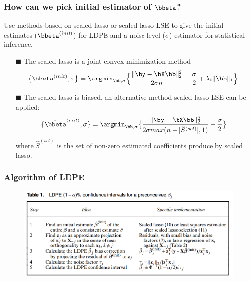 \begin{frame}
\frametitle{How can we pick initial estimator of $\bbeta$?}
Use methods based on scaled lasso or scaled lasso-LSE to give the initial estimates ($\bbeta^{(init)}$) for LDPE and a noise level ($\sigma$) estimator for statistical inference.
\scriptsize
\begin{itemize}
\item[$\blacksquare$] The scaled lasso is a joint convex minimization method
\begin{equation}
\big\{\bbeta^{(init)},\sigma\big\} = \argmin_{\bb,\sigma}
\Big\{\frac{\|\by-\bX\bb\|_2^2}{2\sigma n} + \frac{\sigma}{2}+\lambda_0\|\bb\|_1\Big\}.
\end{equation}
\item[$\blacksquare$] The scaled lasso is biased, an alternative method scaled lasso-LSE can be applied:
\begin{equation}
\{\hat{\bbeta}^{(init)},\sigma\} = \argmin_{\bb,\sigma}
\big\{\frac{\|\by-\bX\bb\|_2^2}{2\sigma max(n-|\hat{S}^{(scl)}|,1)} + \frac{\sigma}{2}\big\}
\end{equation}
where $\hat{S}^{(scl)}$ is the set of non-zero estimated coefficients produce by scaled lasso.
\end{itemize}
\end{frame}


\begin{frame}
\frametitle{Algorithm of LDPE}
\begin{figure}[h]
  \centering
  \includegraphics[width=1.0\textwidth]{./figs/Table1.png}
  \label{Table1}
\end{figure}
\end{frame}


